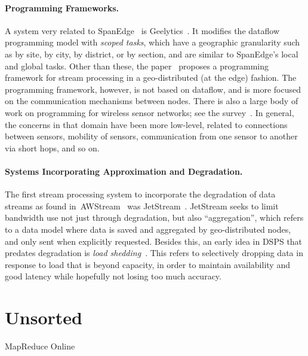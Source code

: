 \paragraph{Programming Frameworks.}
A system very related to SpanEdge~
is Geelytics~\cite{cheng2015geelytics}.
It modifies the dataflow programming model with \emph{scoped tasks}, which have a geographic granularity such as by site, by city, by district, or by section, and are similar to SpanEdge's local and global tasks.
Other than these, the paper~\cite{renart2017datadrivenstreamedge} proposes a programming framework for stream processing in a geo-distributed (at the edge) fashion. The programming framework, however, is not based on dataflow, and is more focused on the communication mechanisms between nodes. There is also a large body of work on programming for wireless sensor networks; see the survey~\cite{mottola2011programming-wsn}. In general, the concerns in that domain have been more low-level, related to connections between sensors, mobility of sensors, communication from one sensor to another via short hops, and so on.

\paragraph{Systems Incorporating Approximation and Degradation.}
The first stream processing system to incorporate the degradation of data streams as found in~AWStream~ was JetStream~\cite{rabkin2014jetstream}.
JetStream seeks to limit bandwidth use not just through degradation, but also ``aggregation'', which refers to a data model where data is saved and aggregated by geo-distributed nodes, and only sent when explicitly requested.
Besides this, an early idea in DSPS that predates degradation is \emph{load shedding}~\cite{tatbul2003load,tatbul2007staying}.
This refers to selectively dropping data in response to load that is beyond capacity, in order to maintain availability and good latency while hopefully not losing too much accuracy.

\section{Unsorted}

MapReduce Online~\cite{condie2010mapreduce}
